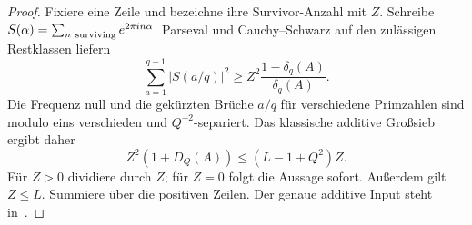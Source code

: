 \documentclass[11pt,a4paper]{article}
\begin{document}
\begin{proof}
Fixiere eine Zeile und bezeichne ihre Survivor-Anzahl mit $Z$.
Schreibe $S(\alpha)=\sum_{n\ {\rm surviving}}e^{2\pi i n\alpha}$.
Parseval und Cauchy--Schwarz auf den zulässigen Restklassen liefern
\[
 \sum_{a=1}^{q-1}|S(a/q)|^2
       \ge Z^2\frac{1-\delta_q(A)}{\delta_q(A)}.
\]
Die Frequenz null und die gekürzten Brüche $a/q$ für verschiedene
Primzahlen sind modulo eins verschieden und $Q^{-2}$-separiert.
Das klassische additive Großsieb~\cite{Bombieri1971,IwaniecKowalski2004,KedlayaANT} ergibt daher
\[
 Z^2(1+D_Q(A))\le(L-1+Q^2)Z.
\]
Für $Z>0$ dividiere durch $Z$; für $Z=0$ folgt die Aussage sofort.
Außerdem gilt $Z\le L$. Summiere über die positiven Zeilen.
Der genaue additive Input steht in~\cite[Satz~18.1]{KedlayaANT}.
\end{proof}
\end{document}
